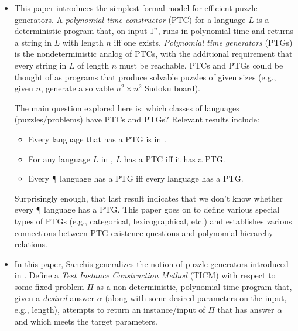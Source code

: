 \begin{itemize}

  \item {}

    \begin{annotation}
      This paper introduces the simplest formal model for efficient puzzle
      generators.  A \emph{polynomial time constructor} (PTC) for a language
      \(L\) is a deterministic program that, on input \(1^n\), runs in
      polynomial-time and returns a string in \(L\) with length \(n\) iff one
      exists.  \emph{Polynomial time generators} (PTGs) is the nondeterministic
      analog of PTCs, with the additional requirement that every string in
      \(L\) of length \(n\) must be reachable.  PTCs and PTGs could be thought
      of as programs that produce solvable puzzles of given sizes (e.g., given
      \(n\), generate a solvable \(n^2 \times n^2\) Sudoku board).

      The main question explored here is: which classes of languages
      (puzzles/problems) have PTCs and PTGs?  Relevant results include:
      \begin{itemize}
        \item Every language that has a PTG is in \NP.
        \item For any language \(L\) in \NP, \(L\) has a PTC iff it has a PTG.
        \item Every \P{} language has a PTG iff every \NP{} language has a PTG.
      \end{itemize}
      Surprisingly enough, that last result indicates that we don't know
      whether every \P{} language has a PTG.  This paper goes on to define
      various special types of PTGs (e.g., categorical, lexicographical, etc.)
      and establishes various connections between PTG-existence questions and
      polynomial-hierarchy relations.
    \end{annotation}

  \item {}

    \begin{annotation}
      In this paper, Sanchis generalizes the notion of puzzle generators
      introduced in \textcite{language-instances}.  Define a \emph{Test
      Instance Construction Method} (TICM) with respect to some fixed problem
      \(\Pi\) as a non-deterministic, polynomial-time program that, given a
      \emph{desired} answer \(\alpha\) (along with some desired parameters on
      the input, e.g., length), attempts to return an instance/input of \(\Pi\)
      that has answer \(\alpha\) and which meets the target parameters.


\end{annotation}
\end{itemize}
